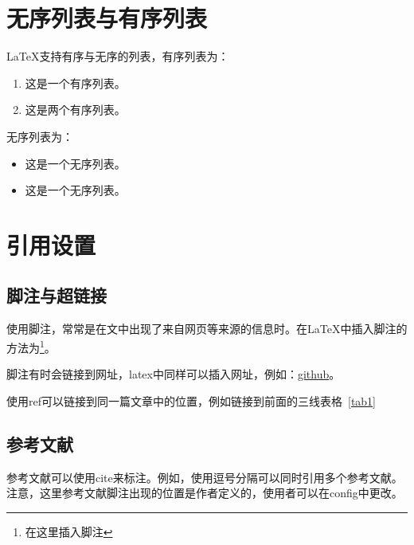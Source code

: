 \section{无序列表与有序列表}

\LaTeX 支持有序与无序的列表，有序列表为：
\begin{enumerate}
\item{这是一个有序列表。}
\item{这是两个有序列表。}
\end{enumerate}

无序列表为：
\begin{itemize}
\item{这是一个无序列表。}
\item{这是一个无序列表。}
\end{itemize}

\section{引用设置}

\subsection{脚注与超链接}

使用脚注，常常是在文中出现了来自网页等来源的信息时。在\LaTeX 中插入脚注的方法为\footnote{在这里插入脚注}。

脚注有时会链接到网址，latex中同样可以插入网址，例如：\href{https://github.com}{github}。

使用ref可以链接到同一篇文章中的位置，例如链接到前面的三线表格~\ref{tab1}

\subsection{参考文献}

参考文献可以使用cite来标注。例如\cite{YihanCao2020}，使用逗号分隔可以同时引用多个参考文献。注意，这里参考文献脚注出现的位置是作者定义的，使用者可以在config中更改。

